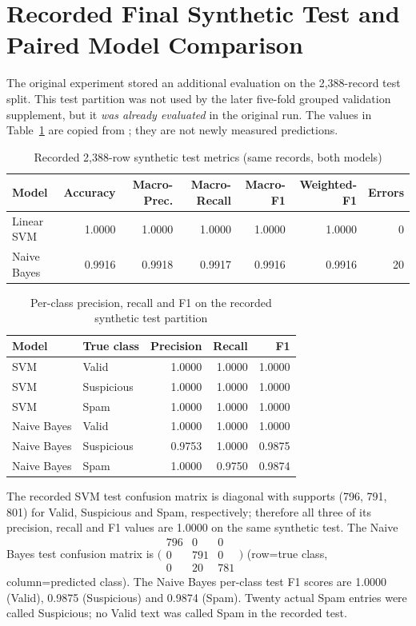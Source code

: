 \section{Recorded Final Synthetic Test and Paired Model Comparison}
\label{sec:m2-recorded-test}
The original experiment stored an additional evaluation on the 2,388-record test split. This test partition was not used by the later five-fold grouped validation supplement, but it \emph{was already evaluated} in the original run. The values in Table~\ref{tab:m2test} are copied from ; they are not newly measured predictions.
\begin{table}[H]\centering\caption{Recorded 2,388-row synthetic test metrics (same records, both models)}\label{tab:m2test}\small\begin{tabular}{lrrrrrr}\toprule
Model & Accuracy & Macro-Prec. & Macro-Recall & Macro-F1 & Weighted-F1 & Errors\\\midrule
Linear SVM & 1.0000 & 1.0000 & 1.0000 & 1.0000 & 1.0000 & 0\\
Naive Bayes & 0.9916 & 0.9918 & 0.9917 & 0.9916 & 0.9916 & 20\\\bottomrule
\end{tabular}\end{table}
\begin{table}[H]\centering\caption{Per-class precision, recall and F1 on the recorded synthetic test partition}\small
\begin{tabular}{llrrr}\toprule Model & True class & Precision & Recall & F1\\\midrule
SVM & Valid & 1.0000 & 1.0000 & 1.0000\\
SVM & Suspicious & 1.0000 & 1.0000 & 1.0000\\
SVM & Spam & 1.0000 & 1.0000 & 1.0000\\
Naive Bayes & Valid & 1.0000 & 1.0000 & 1.0000\\
Naive Bayes & Suspicious & 0.9753 & 1.0000 & 0.9875\\
Naive Bayes & Spam & 1.0000 & 0.9750 & 0.9874\\\bottomrule
\end{tabular}\end{table}
The recorded SVM test confusion matrix is diagonal with supports (796, 791, 801) for Valid, Suspicious and Spam, respectively; therefore all three of its precision, recall and F1 values are 1.0000 on the same synthetic test. The Naive Bayes test confusion matrix is $\bigl(\begin{smallmatrix}796&0&0\\0&791&0\\0&20&781\end{smallmatrix}\bigr)$ (row=true class, column=predicted class). The Naive Bayes per-class test F1 scores are 1.0000 (Valid), 0.9875 (Suspicious) and 0.9874 (Spam). Twenty actual Spam entries were called Suspicious; no Valid text was called Spam in the recorded test.


